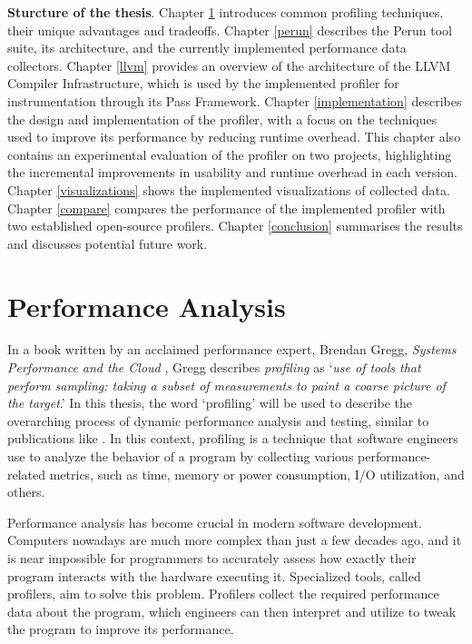 \medskip
\noindent

\textbf{Sturcture of the thesis}. Chapter \ref{performance-analysis} introduces common profiling techniques, their unique advantages and tradeoffs. Chapter \ref{perun} describes the Perun tool suite, its architecture, and the currently implemented performance data collectors. Chapter \ref{llvm} provides an overview of the architecture of the LLVM Compiler Infrastructure, which is used by the implemented profiler for instrumentation through its Pass Framework. Chapter \ref{implementation} describes the design and implementation of the profiler, with a focus on the techniques used to improve its performance by reducing runtime overhead. This chapter also contains an experimental evaluation of the profiler on two projects, highlighting the incremental improvements in usability and runtime overhead in each version. Chapter \ref{visualizations} shows the implemented visualizations of collected data. Chapter \ref{compare} compares the performance of the implemented profiler with two established open-source profilers. Chapter \ref{conclusion} summarises the results and discusses potential future work.


\chapter{Performance Analysis}
\label{performance-analysis}

In a book written by an acclaimed performance expert, Brendan Gregg, \emph{Systems Performance and the Cloud} \cite{gregg-systems-performance}, Gregg describes \emph{profiling} as `\emph{use of tools that perform sampling: taking a subset of measurements to paint a coarse picture of the target}.' In this thesis, the word `profiling' will be used to describe the overarching process of dynamic performance analysis and testing, similar to publications like \cite{nethercote-dyn-bin}. In this context, profiling is a technique that software engineers use to analyze the behavior of a program by collecting various performance-related metrics, such as time, memory or power consumption, I/O utilization, and others.

Performance analysis has become crucial in modern software development. Computers nowadays are much more complex than just a few decades ago, and it is near impossible for programmers to accurately assess how exactly their program interacts with the hardware executing it. Specialized tools, called profilers, aim to solve this problem. Profilers collect the required performance data about the program, which engineers can then interpret and utilize to tweak the program to improve its performance.

